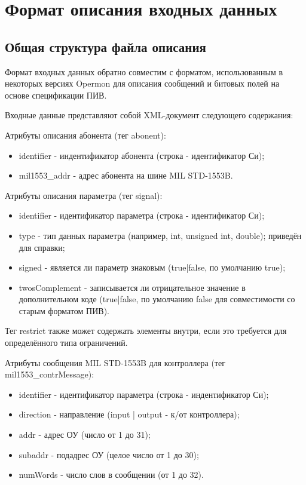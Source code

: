 \section{Формат описания входных данных}
\label{sec:input_format}

\subsection{Общая структура файла описания}
Формат входных данных обратно совместим с форматом, использованным в некоторых 
версиях Opermon для описания сообщений и битовых полей на основе спецификации 
ПИВ.

Входные данные представляют собой XML-документ следующего содержания: 



Атрибуты описания абонента (тег abonent):

\begin{itemize}
 \item identifier - индентификатор абонента (строка - идентификатор Си);
 \item mil1553\_addr - адрес абонента на шине MIL STD-1553B.
\end{itemize}

Атрибуты описания параметра (тег signal):

\begin{itemize}
 \item identifier - идентификатор параметра (строка - идентификатор Си);
 \item type - тип данных параметра (например, int, unsigned int, double); 
приведён для справки;
 \item signed - является ли параметр знаковым (true|false, по умолчанию true);
 \item twosComplement - записывается ли отрицательное значение в 
дополнительном коде (true|false, по умолчанию false для совместимости со 
старым форматом ПИВ).
\end{itemize}

Тег restrict также может содержать элементы внутри, если это требуется для 
определённого типа ограничений.

Атрибуты сообщения MIL STD-1553B для контроллера (тег mil1553\_contrMessage):

\begin{itemize}
 \item identifier - идентификатор параметра (строка - индентификатор Си);
 \item direction - направление (input | output - к/от контроллера);
 \item addr  - адрес ОУ (число от 1 до 31);
 \item subaddr - подадрес ОУ (целое число от 1 до 30);
 \item numWords - число слов в сообщении (от 1 до 32).
\end{itemize}

